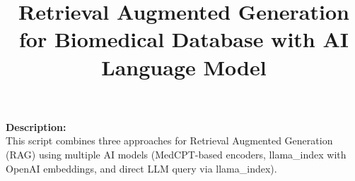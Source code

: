 \documentclass[12pt]{article}
\title{Retrieval Augmented Generation for Biomedical Database with AI Language Model}
\author{} %
\date{}   %
\begin{document}
\maketitle
\thispagestyle{empty}

\vspace{1cm}
\begin{center}
    \textbf{Description:} \\
    This script combines three approaches for Retrieval Augmented Generation (RAG) using multiple AI models (MedCPT-based encoders, llama\_index with OpenAI embeddings, and direct LLM query via llama\_index).
\end{center}

\newpage
\pagestyle{fancy}  %


\end{document}
